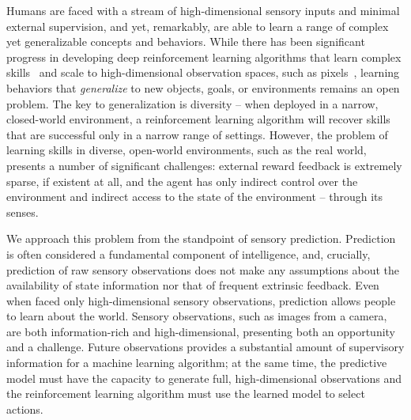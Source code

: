 

Humans are faced with a stream of high-dimensional sensory inputs and minimal external supervision, and yet, remarkably, are able to learn a range of complex yet generalizable concepts and behaviors.
While there has been significant progress in developing deep reinforcement learning algorithms that learn complex skills~\cite{tdgammon,alphago,openai_hand} and scale to high-dimensional observation spaces, such as pixels~\cite{atari,e2e}, learning behaviors that \emph{generalize} to new objects, goals, or environments remains an open problem.
The key to generalization is diversity -- when deployed in a narrow, closed-world environment, a reinforcement learning algorithm will recover skills that are successful only in a narrow range of settings. 
However, the problem of learning skills in diverse, open-world environments, such as the real world, presents a number of significant challenges: external reward feedback is extremely sparse, if existent at all, and the agent has only indirect control over the environment and indirect access to the state of the environment -- through its senses.

We approach this problem from the standpoint of sensory prediction. Prediction is often considered a fundamental component of intelligence, and, crucially, prediction of raw sensory observations does not make any assumptions about the availability of state information nor that of frequent extrinsic feedback. Even when faced only high-dimensional sensory observations, prediction allows people to learn about the world. Sensory observations, such as images from a camera, are both information-rich and high-dimensional, presenting both an opportunity and a challenge. Future observations provides a substantial amount of supervisory information for a machine learning algorithm; at the same time, the predictive model must have the capacity to generate full, high-dimensional observations and the reinforcement learning algorithm must use the learned model to select actions.



